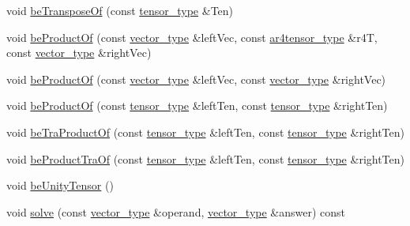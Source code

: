 \begin{DoxyCompactItemize}
void \hyperlink{classcofe_1_1TensorRank2_adeb45423a4fcf114cee11c399fe23326}{be\-Transpose\-Of} (const \hyperlink{classcofe_1_1TensorRank2_a3af9468088af4836c93808edaceb03b0}{tensor\-\_\-type} \&Ten)
\item 
void \hyperlink{classcofe_1_1TensorRank2_a323eb1ab146ace337487ebc240a6fcc1}{be\-Product\-Of} (const \hyperlink{classcofe_1_1TensorRank2_a5c3ced2bb8f6574ba2ce2e1dab9d2c0b}{vector\-\_\-type} \&left\-Vec, const \hyperlink{classcofe_1_1TensorRank2_ae3f28ba9fd3ccd7afe9c5976b6e5178b}{ar4tensor\-\_\-type} \&r4\-T, const \hyperlink{classcofe_1_1TensorRank2_a5c3ced2bb8f6574ba2ce2e1dab9d2c0b}{vector\-\_\-type} \&right\-Vec)
\item 
void \hyperlink{classcofe_1_1TensorRank2_a570391f93730b60cd57cb05fdda5df29}{be\-Product\-Of} (const \hyperlink{classcofe_1_1TensorRank2_a5c3ced2bb8f6574ba2ce2e1dab9d2c0b}{vector\-\_\-type} \&left\-Vec, const \hyperlink{classcofe_1_1TensorRank2_a5c3ced2bb8f6574ba2ce2e1dab9d2c0b}{vector\-\_\-type} \&right\-Vec)
\item 
void \hyperlink{classcofe_1_1TensorRank2_a3edc1495fa6318c924d122b43ae35296}{be\-Product\-Of} (const \hyperlink{classcofe_1_1TensorRank2_a3af9468088af4836c93808edaceb03b0}{tensor\-\_\-type} \&left\-Ten, const \hyperlink{classcofe_1_1TensorRank2_a3af9468088af4836c93808edaceb03b0}{tensor\-\_\-type} \&right\-Ten)
\item 
void \hyperlink{classcofe_1_1TensorRank2_afc7fa48bc56f6a2784481758e16761c2}{be\-Tra\-Product\-Of} (const \hyperlink{classcofe_1_1TensorRank2_a3af9468088af4836c93808edaceb03b0}{tensor\-\_\-type} \&left\-Ten, const \hyperlink{classcofe_1_1TensorRank2_a3af9468088af4836c93808edaceb03b0}{tensor\-\_\-type} \&right\-Ten)
\item 
void \hyperlink{classcofe_1_1TensorRank2_a50e2406d1358dd9c4a1d95aba6cd7375}{be\-Product\-Tra\-Of} (const \hyperlink{classcofe_1_1TensorRank2_a3af9468088af4836c93808edaceb03b0}{tensor\-\_\-type} \&left\-Ten, const \hyperlink{classcofe_1_1TensorRank2_a3af9468088af4836c93808edaceb03b0}{tensor\-\_\-type} \&right\-Ten)
\item 
void \hyperlink{classcofe_1_1TensorRank2_ae57410d40bcb8f8b0fabe31acc478ad2}{be\-Unity\-Tensor} ()
\item 
void \hyperlink{classcofe_1_1TensorRank2_af28aac212a14afce9e6e0554234cf3bb}{solve} (const \hyperlink{classcofe_1_1TensorRank2_a5c3ced2bb8f6574ba2ce2e1dab9d2c0b}{vector\-\_\-type} \&operand, \hyperlink{classcofe_1_1TensorRank2_a5c3ced2bb8f6574ba2ce2e1dab9d2c0b}{vector\-\_\-type} \&answer) const 
\item 

\end{DoxyCompactItemize}
